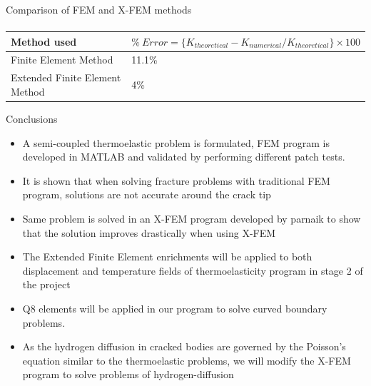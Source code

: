 \documentclass{beamer}
\begin{document}
\begin{frame}[t,fragile]{Comparison of FEM and X-FEM methods}
\begin{align*}
\end{align*}
\vspace{-28pt}
\bgroup
\def\arraystretch{2}  
\begin{table}[H]
    \centering
    \begin{tabular}{|C{3cm}|C{6cm}|}
\hline 
Method used& $\% \ Error= \{K_{theoretical}-K_{numerical}/K_{theoretical}\}\times 100$\\
\hline
 Finite Element Method & 11.1\%\\
\hline
 Extended Finite Element Method& 4\%\\
\hline
\end{tabular}
\label{table1}
\end{table}
\egroup
\end{frame} 
\begin{frame}[t,fragile]{Conclusions}
    \vspace{-.2cm}
    \footnotesize
\begin{itemize}
       \item A semi-coupled thermoelastic problem is formulated, FEM program is developed in MATLAB and validated by performing different patch tests.
       \item It is shown that when solving fracture problems with traditional FEM program, solutions are not accurate around the crack tip
       \item Same problem is solved in an X-FEM program developed by parnaik to show that the solution improves drastically when using X-FEM
       \item The Extended Finite Element enrichments will be applied to both displacement and temperature fields of thermoelasticity program in stage 2 of the project  
       \item Q8 elements will be applied in our program to solve curved boundary problems. 
       \item As the hydrogen diffusion in cracked bodies are governed by the Poisson's equation similar to the thermoelastic problems, we will modify the X-FEM program to solve problems of hydrogen-diffusion 
    \end{itemize}
\end{frame}
\end{document}
